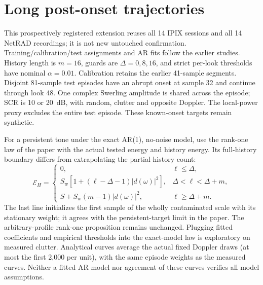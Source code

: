 \documentclass[10pt]{article}
\begin{document}
\section{Long post-onset trajectories}\label{sup:long_guard}
This prospectively registered extension reuses all 14 IPIX sessions and all 14 NetRAD recordings; it is not new untouched confirmation. Training/calibration/test assignments and AR fits follow the earlier studies. History length is $m=16$, guards are $\Delta=0,8,16$, and strict per-look thresholds have nominal $\alpha=0.01$. Calibration retains the earlier 41-sample segments. Disjoint 81-sample test episodes have an abrupt onset at sample 32 and continue through look 48. One complex Swerling amplitude is shared across the episode; SCR is 10 or 20~dB, with random, clutter and opposite Doppler. The local-power proxy excludes the entire test episode. These known-onset targets remain synthetic.

For a persistent tone under the exact AR(1), no-noise model, use the rank-one law of the paper with the actual tested energy and history energy. Its full-history boundary differs from extrapolating the partial-history count:
\[
\mathcal E_H=\begin{cases}
0,&\ell\le\Delta,\\
S_w[1+(\ell-\Delta-1)|d(\omega)|^2],&\Delta<\ell<\Delta+m,\\
S+S_w(m-1)|d(\omega)|^2,&\ell\ge\Delta+m.
\end{cases}
\]
The last line initializes the first sample of the wholly contaminated scale with its stationary weight; it agrees with the persistent-target limit in the paper. The arbitrary-profile rank-one proposition remains unchanged. Plugging fitted coefficients and empirical thresholds into the exact-model law is exploratory on measured clutter. Analytical curves average the actual fixed Doppler draws (at most the first 2,000 per unit), with the same episode weights as the measured curves. Neither a fitted AR model nor agreement of these curves verifies all model assumptions.
\end{document}
